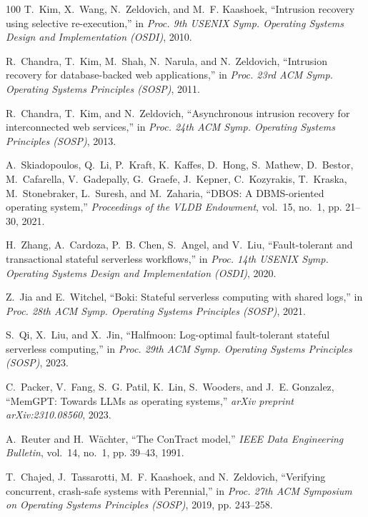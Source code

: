 \begin{thebibliography}{100}
T.~Kim, X.~Wang, N.~Zeldovich, and M.~F. Kaashoek, ``Intrusion recovery using
  selective re-execution,'' in \emph{Proc. 9th USENIX Symp. Operating Systems
  Design and Implementation (OSDI)}, 2010.

R.~Chandra, T.~Kim, M.~Shah, N.~Narula, and N.~Zeldovich, ``Intrusion recovery
  for database-backed web applications,'' in \emph{Proc. 23rd ACM Symp.
  Operating Systems Principles (SOSP)}, 2011.

R.~Chandra, T.~Kim, and N.~Zeldovich, ``Asynchronous intrusion recovery for
  interconnected web services,'' in \emph{Proc. 24th ACM Symp. Operating
  Systems Principles (SOSP)}, 2013.

A.~Skiadopoulos, Q.~Li, P.~Kraft, K.~Kaffes, D.~Hong, S.~Mathew, D.~Bestor,
  M.~Cafarella, V.~Gadepally, G.~Graefe, J.~Kepner, C.~Kozyrakis, T.~Kraska,
  M.~Stonebraker, L.~Suresh, and M.~Zaharia, ``{DBOS}: A {DBMS}-oriented
  operating system,'' \emph{Proceedings of the VLDB Endowment}, vol.~15,
  no.~1, pp. 21--30, 2021.

H.~Zhang, A.~Cardoza, P.~B. Chen, S.~Angel, and V.~Liu, ``Fault-tolerant and
  transactional stateful serverless workflows,'' in \emph{Proc. 14th USENIX
  Symp. Operating Systems Design and Implementation (OSDI)}, 2020.

Z.~Jia and E.~Witchel, ``Boki: Stateful serverless computing with shared
  logs,'' in \emph{Proc. 28th ACM Symp. Operating Systems Principles (SOSP)},
  2021.

S.~Qi, X.~Liu, and X.~Jin, ``Halfmoon: Log-optimal fault-tolerant stateful
  serverless computing,'' in \emph{Proc. 29th ACM Symp. Operating Systems
  Principles (SOSP)}, 2023.

C.~Packer, V.~Fang, S.~G. Patil, K.~Lin, S.~Wooders, and J.~E. Gonzalez,
  ``{MemGPT}: Towards {LLMs} as operating systems,'' \emph{arXiv preprint
  arXiv:2310.08560}, 2023.

A.~Reuter and H.~W{\"a}chter, ``The {ConTract} model,'' \emph{IEEE Data
  Engineering Bulletin}, vol.~14, no.~1, pp. 39--43, 1991.

T.~Chajed, J.~Tassarotti, M.~F. Kaashoek, and N.~Zeldovich, ``Verifying
  concurrent, crash-safe systems with {Perennial},'' in \emph{Proc. 27th ACM
  Symposium on Operating Systems Principles (SOSP)}, 2019, pp. 243--258.


\end{thebibliography}
